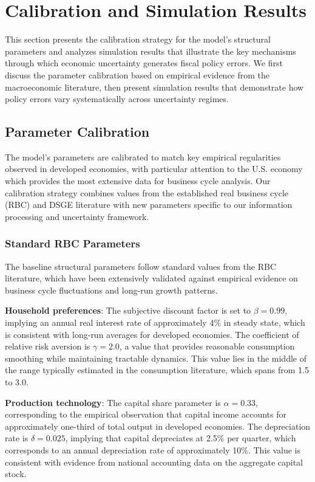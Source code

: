\documentclass[5p,authoryear]{elsarticle}
\begin{document}
\section{Calibration and Simulation Results}

This section presents the calibration strategy for the model's structural parameters and analyzes simulation results that illustrate the key mechanisms through which economic uncertainty generates fiscal policy errors. We first discuss the parameter calibration based on empirical evidence from the macroeconomic literature, then present simulation results that demonstrate how policy errors vary systematically across uncertainty regimes.

\subsection{Parameter Calibration}

The model's parameters are calibrated to match key empirical regularities observed in developed economies, with particular attention to the U.S. economy which provides the most extensive data for business cycle analysis. Our calibration strategy combines values from the established real business cycle (RBC) and DSGE literature with new parameters specific to our information processing and uncertainty framework.

\subsubsection{Standard RBC Parameters}

The baseline structural parameters follow standard values from the RBC literature, which have been extensively validated against empirical evidence on business cycle fluctuations and long-run growth patterns.

\textbf{Household preferences}: The subjective discount factor is set to $\beta = 0.99$, implying an annual real interest rate of approximately 4\% in steady state, which is consistent with long-run averages for developed economies. The coefficient of relative risk aversion is $\gamma = 2.0$, a value that provides reasonable consumption smoothing while maintaining tractable dynamics. This value lies in the middle of the range typically estimated in the consumption literature, which spans from 1.5 to 3.0.

\textbf{Production technology}: The capital share parameter is $\alpha = 0.33$, corresponding to the empirical observation that capital income accounts for approximately one-third of total output in developed economies. The depreciation rate is $\delta = 0.025$, implying that capital depreciates at 2.5\% per quarter, which corresponds to an annual depreciation rate of approximately 10\%. This value is consistent with evidence from national accounting data on the aggregate capital stock.
\end{document}
